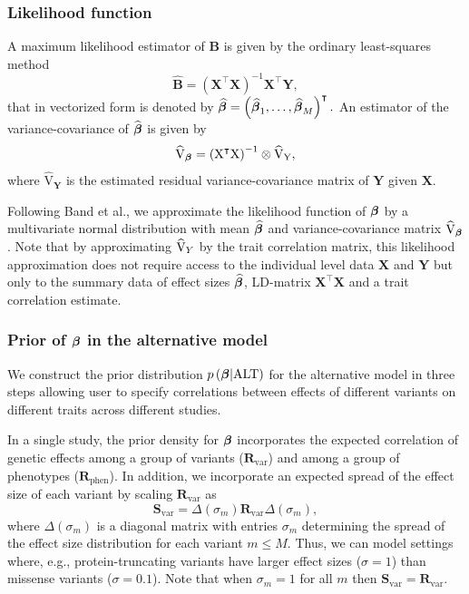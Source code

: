 \subsubsection*{Likelihood function} 
\label{approxlikelihood}
A maximum likelihood estimator of $\mathbf{\textrm{B}}$ is given by the ordinary least-squares method
$$\widehat{\mathbf{\textrm{B}}} = \left(\mathbf{\textrm{X}}^\intercal\mathbf{\textrm{X}}\right)^{-1}\mathbf{\textrm{X}}^{\intercal}\mathbf{\textrm{Y}},$$
that in vectorized form is denoted by   
$\boldsymbol {\widehat{ \beta}} = \left(\boldsymbol {\widehat{ \beta}}_{1},\dots,\boldsymbol {\widehat{\beta}}_{M}\right)^{\intercal}.$
An estimator of the variance-covariance of $\widehat{\boldsymbol \beta}$  is given by 
$$\widehat{\textrm{V}}_{\mathbf{\boldsymbol \beta}} =  \left(\mathbf{\textrm{X}}^\intercal\mathbf{\textrm{X}}\right)^{-1}\otimes \widehat{\textrm{V}}_{\mathbf{\textrm{Y}}},$$
where $\widehat{\textrm{V}}_{\mathbf{\textrm{Y}}}$ is the estimated residual variance-covariance matrix of $\mathbf{\textrm{Y}}$ given $\mathbf{\textrm{X}}$. 

Following Band et al.\cite{band2013imputation}, we approximate the likelihood function of $\boldsymbol {\beta}$ by a multivariate normal distribution with mean $\boldsymbol {\widehat{\beta}}$ and variance-covariance matrix $\widehat{\textrm{V}}_{\boldsymbol {\beta}}$. Note that by approximating $\widehat{\textrm{V}}_Y$ by the trait correlation matrix, this likelihood approximation does not require access to the individual level data $\mathbf{\textrm{X}}$ and $\mathbf{\textrm{Y}}$ but only to the 
summary data of effect sizes $\boldsymbol {\widehat{\beta}}$, LD-matrix $\mathbf{\textrm{X}}^\intercal\mathbf{\textrm{X}}$ and a trait correlation estimate.


\subsubsection*{Prior of $\boldsymbol{\beta}$ in the alternative model} 
\label{prioralt}
We construct the prior distribution $p\left({\boldsymbol {\beta}} | \textrm{ALT} \right)$ for the alternative model in three steps allowing 
user to specify correlations between effects of different variants on different traits across different studies.

In a single study, the prior density for ${\boldsymbol {\beta}}$ incorporates the expected correlation of genetic effects among 
a group of variants ($\mathbf{R}_{\textrm{var}}$) and among a group of phenotypes ($\mathbf{R}_{\textrm{phen}}$). 
In addition, we  incorporate an expected spread of the effect size of each variant by scaling $\mathbf{R}_{\textrm{var}}$ as 
$$\mathbf{S}_{\textrm{var}} = \Delta\left(\sigma_m\right) \mathbf{R}_{\textrm{var}} \Delta\left(\sigma_m\right),$$
where $\Delta\left(\sigma_m\right)$ is a diagonal matrix with entries $\sigma_m$ determining the spread of the effect size distribution for each variant $m \leq M$. Thus, we can model settings where, e.g., protein-truncating variants have larger effect sizes ($\sigma = 1$) than missense variants ($\sigma = 0.1$). 
Note that when $\sigma_m = 1$ for all $m$ then $\mathbf{S}_{\textrm{var}} = \mathbf{R}_{\textrm{var}}$. 

